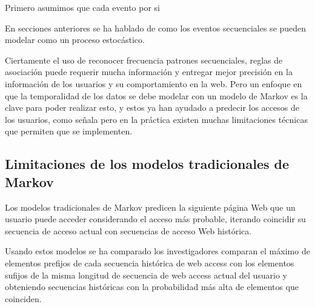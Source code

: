 %
Primero asumimos que cada evento por si 



En secciones anteriores se ha hablado de como los eventos secuenciales se pueden modelar como un proceso estocástico.

Ciertamente el uso de reconocer frecuencia patrones secuenciales, reglas de asociación puede requerir mucha  información y entregar mejor precisión en la información de los usuarios y su comportamiento en la web. Pero un enfoque en que la temporalidad de los datos se debe modelar con un modelo de Markov es la clave para poder realizar esto, y estos ya han ayudado a predecir los accesos de los usuarios, como señala %
pero en la práctica existen muchas limitaciones técnicas que permiten que se implementen. 

 





 
 
 \subsection{Limitaciones de los modelos tradicionales de Markov}
 
 
 Los modelos tradicionales de Markov predicen la siguiente página Web que un usuario puede acceder considerando el acceso más probable, iterando coincidir su secuencia de acceso actual con secuencias de acceso Web histórica.
 
 
 Usando estos modelos se ha comparado los investigadores comparan el máximo de elementos  prefijos de cada secuencia histórica de web access con los elementos sufijos de la  misma longitud de secuencia de web access actual del usuario y obteniendo secuencias históricas con la probabilidad más alta de elementos que coinciden.
 
